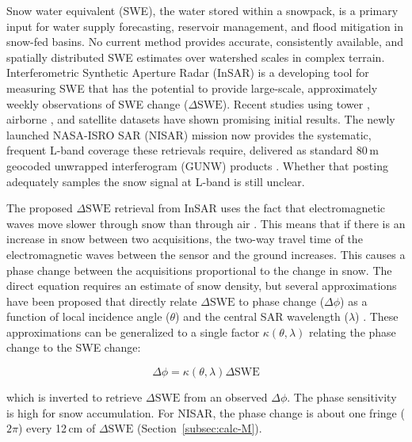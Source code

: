 \documentclass[tc, manuscript]{copernicus}
\begin{document}
\introduction  %
Snow water equivalent (SWE), the water stored within a snowpack, is a primary input for water supply forecasting, reservoir management, and flood mitigation in snow-fed basins. No current method provides accurate, consistently available, and spatially distributed SWE estimates over watershed scales in complex terrain. Interferometric Synthetic Aperture Radar (InSAR) is a developing tool for measuring SWE that has the potential to provide large-scale, approximately weekly observations of SWE change ($\Delta\mathrm{SWE}$). Recent studies using tower \citep{Leinss2015, Ruiz2021}, airborne \citep{Marshall2021, Nagler2022, Tarricone2023, Hoppinen2023w2, palomaki2025spatiotemporal-df9, Bonnell2024}, and satellite \citep{Belinska2022, Oveisgharan2024, ruiz2024} datasets have shown promising initial results. The newly launched NASA-ISRO SAR (NISAR) mission now provides the systematic, frequent L-band coverage these retrievals require, delivered as standard 80\,\unit{m} geocoded unwrapped interferogram (GUNW) products \citep{rosen2017nasa-isro-baa}. Whether that posting adequately samples the snow signal at L-band is still unclear.

The proposed $\Delta\mathrm{SWE}$ retrieval from InSAR uses the fact that electromagnetic waves move slower through snow than through air \citep{Guneriussen2001, Leinss2015}. This means that if there is an increase in snow between two acquisitions, the two-way travel time of the electromagnetic waves between the sensor and the ground increases. This causes a phase change between the acquisitions proportional to the change in snow. The direct equation requires an estimate of snow density, but several approximations have been proposed that directly relate $\Delta\mathrm{SWE}$ to phase change ($\Delta\phi$) as a function of local incidence angle ($\theta$) and the central SAR wavelength ($\lambda$) \citep{Leinss2015, Oveisgharan2024}. These approximations can be generalized to a single factor $\kappa(\theta,\lambda)$ relating the phase change to the SWE change:

\begin{equation}\label{eq:dswe2dphi}
    \Delta\phi = \kappa (\theta, \lambda) \Delta\mathrm{SWE}
\end{equation}

\noindent which is inverted to retrieve $\Delta\mathrm{SWE}$ from an observed $\Delta\phi$. The phase sensitivity is high for snow accumulation. For NISAR, the phase change is about one fringe ($2\pi$) every 12\,\unit{cm} of $\Delta\mathrm{SWE}$ (Section~\ref{subsec:calc-M}).
\end{document}
